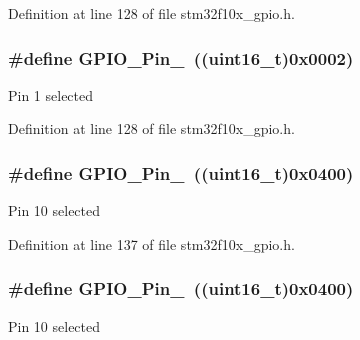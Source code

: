 Definition at line 128 of file stm32f10x\+\_\+gpio.\+h.

\subsubsection[{\texorpdfstring{G\+P\+I\+O\+\_\+\+Pin\+\_\+1}{GPIO_Pin_1}}]{\setlength{\rightskip}{0pt plus 5cm}\#define G\+P\+I\+O\+\_\+\+Pin\+\_~(({\bf uint16\+\_\+t})0x0002)}\hypertarget{group___g_p_i_o__pins__define_ga29db642c26f1fa0fffc3ecadcd30f82b}{}\label{group___g_p_i_o__pins__define_ga29db642c26f1fa0fffc3ecadcd30f82b}
Pin 1 selected 

Definition at line 128 of file stm32f10x\+\_\+gpio.\+h.

\subsubsection[{\texorpdfstring{G\+P\+I\+O\+\_\+\+Pin\+\_\+10}{GPIO_Pin_10}}]{\setlength{\rightskip}{0pt plus 5cm}\#define G\+P\+I\+O\+\_\+\+Pin\+\_~(({\bf uint16\+\_\+t})0x0400)}\hypertarget{group___g_p_i_o__pins__define_ga726af6407ba60ac60f02057227c2d348}{}\label{group___g_p_i_o__pins__define_ga726af6407ba60ac60f02057227c2d348}
Pin 10 selected 

Definition at line 137 of file stm32f10x\+\_\+gpio.\+h.

\subsubsection[{\texorpdfstring{G\+P\+I\+O\+\_\+\+Pin\+\_\+10}{GPIO_Pin_10}}]{\setlength{\rightskip}{0pt plus 5cm}\#define G\+P\+I\+O\+\_\+\+Pin\+\_~(({\bf uint16\+\_\+t})0x0400)}\hypertarget{group___g_p_i_o__pins__define_ga726af6407ba60ac60f02057227c2d348}{}\label{group___g_p_i_o__pins__define_ga726af6407ba60ac60f02057227c2d348}
Pin 10 selected 


